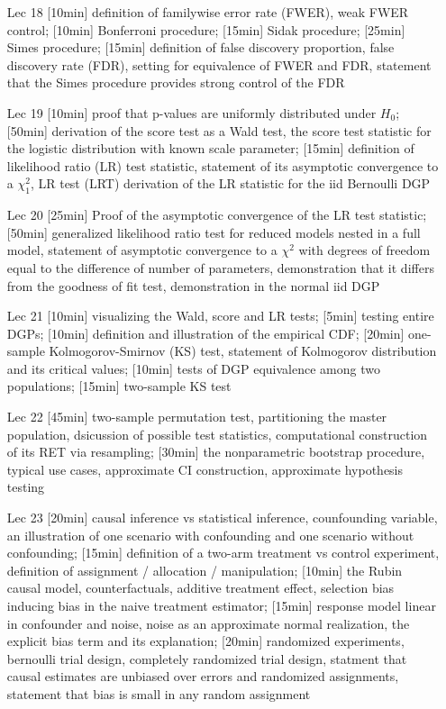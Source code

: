 \documentclass[12pt]{article}
\begin{document}
\begin{enumerate}
\item[Lec 18] [10min] definition of familywise error rate (FWER), weak FWER control; [10min] Bonferroni procedure; [15min] Sidak procedure; [25min] Simes procedure; [15min] definition of false discovery proportion, false discovery rate (FDR), setting for equivalence of FWER and FDR, statement that the Simes procedure provides strong control of the FDR

\item[Lec 19] [10min] proof that p-values are uniformly distributed under $H_0$; [50min] derivation of the score test as a Wald test, the score test statistic for the logistic distribution with known scale parameter; [15min] definition of likelihood ratio (LR) test statistic, statement of its asymptotic convergence to a $\chi^2_1$, LR test (LRT) derivation of the LR statistic for the iid Bernoulli DGP

\item[Lec 20] [25min] Proof of the asymptotic convergence of the LR test statistic; [50min] generalized likelihood ratio test for reduced models nested in a full model, statement of asymptotic convergence to a $\chi^2$ with degrees of freedom equal to the difference of number of parameters, demonstration that it differs from the goodness of fit test, demonstration in the normal iid DGP

\item[Lec 21] [10min] visualizing the Wald, score and LR tests; [5min] testing entire DGPs; [10min] definition and illustration of the empirical CDF; [20min] one-sample Kolmogorov-Smirnov (KS) test, statement of Kolmogorov distribution and its critical values; [10min] tests of DGP equivalence among two populations; [15min] two-sample KS test

\item[Lec 22] [45min] two-sample permutation test, partitioning the master population, dsicussion of possible test statistics, computational construction of its RET via resampling; [30min] the nonparametric bootstrap procedure, typical use cases, approximate CI construction, approximate hypothesis testing

\item[Lec 23] [20min] causal inference vs statistical inference, counfounding variable, an illustration of one scenario with confounding and one scenario without confounding; [15min] definition of a two-arm treatment vs control experiment, definition of assignment / allocation / manipulation; [10min] the Rubin causal model, counterfactuals, additive treatment effect, selection bias inducing bias in the naive treatment estimator; [15min] response model linear in confounder and noise, noise as an approximate normal realization, the explicit bias term and its explanation; [20min] randomized experiments, bernoulli trial design, completely randomized trial design, statment that causal estimates are unbiased over errors and randomized assignments, statement that bias is small in any random assignment

\end{enumerate}
\end{document}
